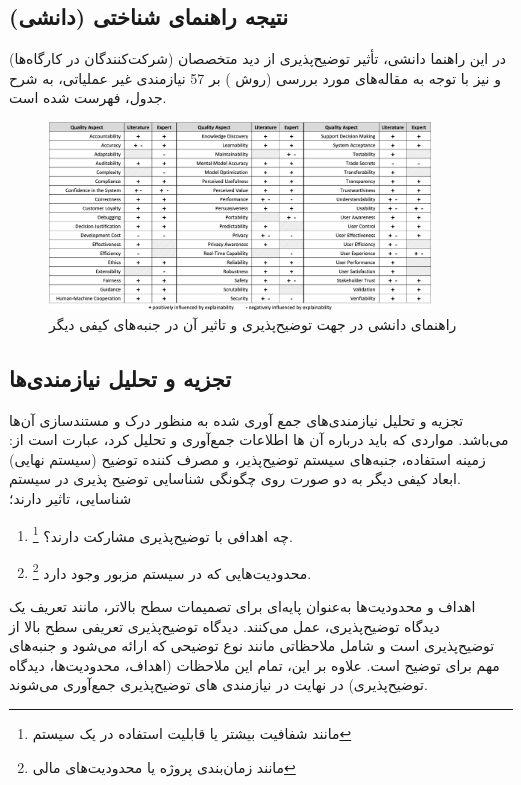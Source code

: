 \subsection{نتیجه راهنمای شناختی (دانشی)}

در این راهنما دانشی، تأثیر توضیح‌پذیری از دید متخصصان (شرکت‌کنندگان در
کارگاه‌ها) و نیز با توجه به مقاله‌های مورد بررسی (روش ) بر 57 نیازمندی
غیر عملیاتی، به شرح جدول، فهرست شده است. 

\begin{figure}[H]
    \centering
    \includegraphics[width=0.9\textwidth]{images/knowledge_catalogue.png}
    \caption{راهنمای دانشی در جهت توضیح‌پذیری و تاثیر آن در جنبه‌های کیفی دیگر}
    \label{fig:resultOfKnowledgeCatalogue}
\end{figure}

\subsection{تجزیه و تحلیل نیازمندی‌ها}

تجزیه و تحلیل نیازمندی‌های جمع آوری شده به منظور درک و مستندسازی آن‌ها می‌باشد.
مواردی که باید درباره آن ها اطلاعات جمع‌آوری و تحلیل کرد، عبارت است از: زمینه
استفاده، جنبه‌های سیستم توضیح‌پذیر، و مصرف کننده توضیح (سیستم نهایی) .ابعاد کیفی
دیگر به دو صورت روی چگونگی شناسایی توضیح پذیری در سیستم شناسایی، تاثیر دارند؛  

\begin{enumerate}
    \item چه اهدافی با توضیح‌پذیری مشارکت دارند؟ \footnote{مانند شفافیت بیشتر یا
    قابلیت استفاده در یک سیستم}.
    \item محدودیت‌هایی که در سیستم مزبور وجود دارد \footnote{مانند زمان‌بندی
    پروژه یا محدودیت‌های مالی}.
\end{enumerate}

اهداف و محدودیت‌ها به‌عنوان پایه‌ای برای تصمیمات سطح بالاتر، مانند تعریف یک
دیدگاه توضیح‌پذیری، عمل می‌کنند. دیدگاه توضیح‌پذیری تعریفی سطح بالا از
توضیح‌پذیری است و شامل ملاحظاتی مانند نوع توضیحی که ارائه می‌شود و جنبه‌های مهم
برای توضیح است. علاوه بر این، تمام این ملاحظات (اهداف، محدودیت‌ها، دیدگاه
توضیح‌پذیری) در نهایت در نیازمندی های توضیح‌پذیری جمع‌آوری می‌شوند.

